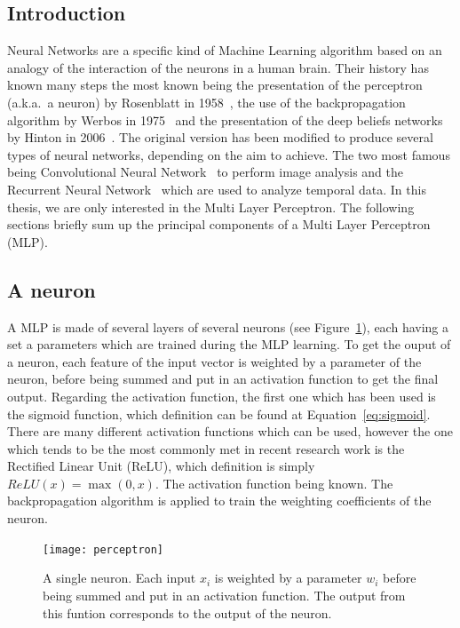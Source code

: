 \subsection{Introduction}

Neural Networks are a specific kind of Machine Learning algorithm based on an analogy of the interaction of the neurons in a human brain. Their history has known many steps the most known being the presentation of the perceptron (a.k.a.\ a neuron) by Rosenblatt in 1958~\cite{rosenblatt1958perceptron}, the use of the backpropagation algorithm by Werbos in 1975~\cite{werbos1974beyond} and the presentation of the deep beliefs networks by Hinton in 2006~\cite{hinton2006fast}. The original version has been modified to produce several types of neural networks, depending on the aim to achieve. The two most famous being Convolutional Neural Network~\cite{krizhevsky2012imagenet} to perform image analysis and the Recurrent Neural Network~\cite{mikolov2010recurrent} which are used to analyze temporal data. In this thesis, we are only interested in the Multi Layer Perceptron. The following sections briefly sum up the principal components of a Multi Layer Perceptron (MLP). 

\subsection{A neuron}

A MLP is made of several layers of several neurons (see Figure~\ref{fig:neuron}), each having a set a parameters which are trained during the MLP learning. To get the ouput of a neuron, each feature of the input vector is weighted by a parameter of the neuron, before being summed and put in an activation function to get the final output. Regarding the activation function, the first one which has been used is the sigmoid function, which definition can be found at Equation~\ref{eq:sigmoid}. There are many different activation functions which can be used, however the one which tends to be the most commonly met in recent research work is the Rectified Linear Unit (ReLU), which definition is simply $ReLU(x) = \max(0, x)$. The activation function being known. The backpropagation algorithm is applied to train the weighting coefficients of the neuron.


    \begin{figure}[h]
        \centering
        \texttt{[image: perceptron]}
        \caption{A single neuron. Each input $x_i$ is weighted by a parameter $w_i$ before being summed and put in an activation function. The output from this funtion corresponds to the output of the neuron.}
\label{fig:neuron}
    \end{figure}

